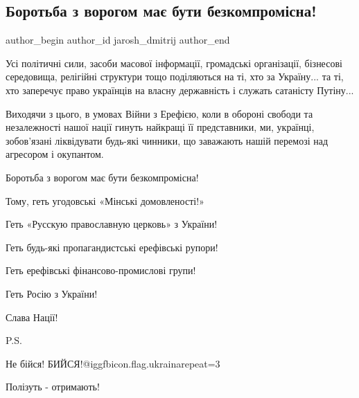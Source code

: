  
 
 
 
 
 
\subsection{Боротьба з ворогом має бути безкомпромісна!}
\label{sec:12_02_2022.fb.jarosh_dmitrij.1.borotjba_z_vorogom}
 
\ifcmt
 author_begin
   author_id jarosh_dmitrij
 author_end
\fi

Усі політичні сили, засоби масової інформації, громадські організації,
бізнесові середовища, релігійні структури тощо поділяються на ті, хто за
Україну... та ті, хто заперечує право українців на власну державність і служать
сатаністу Путіну...

Виходячи з цього, в умовах Війни з Ерефією, коли в обороні свободи та
незалежності нашої нації гинуть найкращі її представники, ми, українці,
зобов’язані ліквідувати будь-які чинники, що заважають нашій перемозі над
агресором і окупантом.

Боротьба з ворогом має бути безкомпромісна!

Тому, геть угодовські «Мінські домовленості!»

Геть «Русскую православную церковь» з України!

Геть будь-які пропагандистські ерефівські рупори!

Геть ерефівські фінансово-промислові групи!

Геть Росію з України!

Слава Нації!

P.S. 

Не бійся! БИЙСЯ!@igg{fbicon.flag.ukraina}{repeat=3}

Полізуть - отримають!
